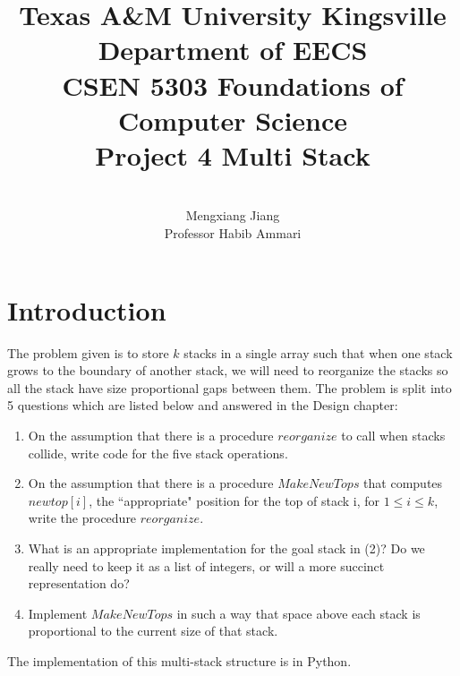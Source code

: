 \documentclass[12pt]{report}
\begin{document}
 
 
\title{Texas A\&M University Kingsville\\
Department of EECS\\
CSEN 5303 Foundations of Computer Science\\
Project 4 Multi Stack
}%
\author{\\
Mengxiang Jiang\\ %
Professor Habib Ammari} %
 
\maketitle

\tableofcontents

\chapter{Introduction}
The problem given is to store $k$ stacks in a single array such that when one stack grows
to the boundary of another stack, we will need to reorganize the stacks so all the stack have size proportional gaps between them.
The problem is split into 5 questions which are listed below and answered in the Design chapter:

\begin{enumerate}
    \item On the assumption that there is a procedure $reorganize$ to call when stacks collide, write
    code for the five stack operations. 
    \item On the assumption that there is a procedure $MakeNewTops$ that computes $newtop[i]$, the
    ``appropriate" position for the top of stack i, for $1 \leq i \leq k$, write the procedure $reorganize$.
    \item What is an appropriate implementation for the goal stack in (2)? Do we really need to keep
    it as a list of integers, or will a more succinct representation do?
    \item Implement $MakeNewTops$ in such a way that space above each stack is proportional to the
    current size of that stack. 
\end{enumerate}

The implementation of this multi-stack structure is in Python.
\end{document}
